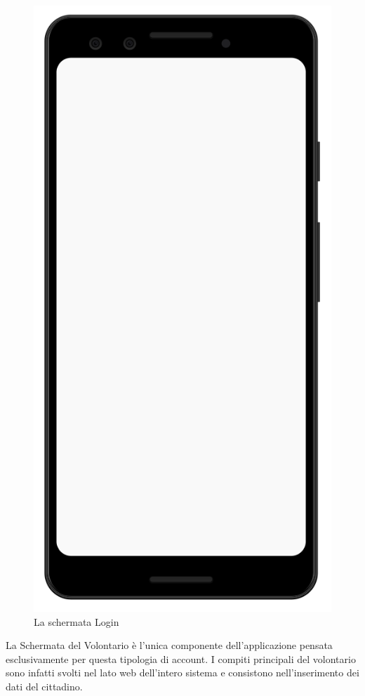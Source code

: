 \documentclass[12pt,a4paper,twoside,openright,titlepage]{book}
\begin{document}
\begin{figure}[H]
\includegraphics[scale = 0.2]{mobile}
\caption{La schermata Login}
\end{figure}
La Schermata del Volontario è l'unica componente dell'applicazione pensata esclusivamente per questa tipologia di account. I compiti principali del volontario sono infatti svolti nel lato web dell'intero sistema e consistono nell'inserimento dei dati del cittadino. \newline
\end{document}
